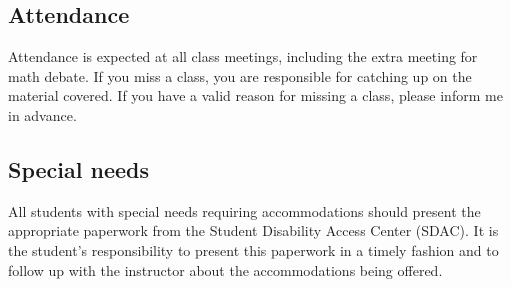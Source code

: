 \documentclass[oneside,11pt]{amsart}
\begin{document}
\subsection{Attendance}

Attendance is expected at all class meetings, including the extra meeting for math debate. If you miss a class, you are responsible for catching up on the material covered. If you have a valid reason for missing a class, please inform me in advance.

\subsection{Special needs}

All students with special needs requiring accommodations should present the appropriate paperwork from the Student Disability Access Center (SDAC). It is the student's responsibility to present this paperwork in a timely fashion and to follow up with the instructor about the accommodations being offered.
%
\end{document}
